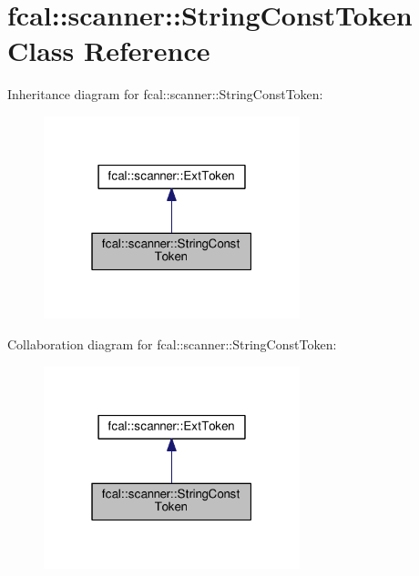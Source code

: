 \hypertarget{classfcal_1_1scanner_1_1StringConstToken}{}\section{fcal\+:\+:scanner\+:\+:String\+Const\+Token Class Reference}
\label{classfcal_1_1scanner_1_1StringConstToken}


Inheritance diagram for fcal\+:\+:scanner\+:\+:String\+Const\+Token\+:
\nopagebreak
\begin{figure}[H]
\begin{center}
\leavevmode
\includegraphics[width=211pt]{classfcal_1_1scanner_1_1StringConstToken__inherit__graph}
\end{center}
\end{figure}


Collaboration diagram for fcal\+:\+:scanner\+:\+:String\+Const\+Token\+:
\nopagebreak
\begin{figure}[H]
\begin{center}
\leavevmode
\includegraphics[width=211pt]{classfcal_1_1scanner_1_1StringConstToken__coll__graph}
\end{center}
\end{figure}
